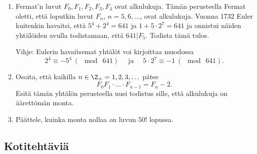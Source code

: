 \begin{enumerate}
\item Fermat'n luvut $F_0, F_1, F_2, F_3, F_4$ ovat alkulukuja. Tämän perusteella Fermat oletti, että loputkin luvut $F_n$, $n=5,6,\ldots$, ovat alkulukuja. Vuonna 1732 Euler kuitenkin havaitsi, että $5^4 + 2^4 = 641$
ja $1 + 5\cdot 2^7 = 641$ ja onnistui näiden yhtälöiden avulla todistamaan, että $641 | F_5$. Todista tämä tulos.

Vihje: Eulerin havaitsemat yhtälöt voi kirjoittaa muodossa
\[
2^4 \equiv -5^4\ (\mod\ 641)\quad\text{ ja }\quad5\cdot 2^7 \equiv -1\ (\mod\ 641).
\]

\item  Osoita, että kaikilla $n\in\Z_{+}=1,2,3,\ldots$ pätee
\[
F_{0}F_{1}\cdot \ldots \cdot F_{n-1} = F_{n} - 2.
\]
Esitä tämän yhtälön perusteella uusi todistus sille,
että alkulukuja on äärettömän monta.

\item Päättele, kuinka monta nollaa on luvun $50!$ lopussa.

\end{enumerate}

\subsection*{Kotitehtäviä}

